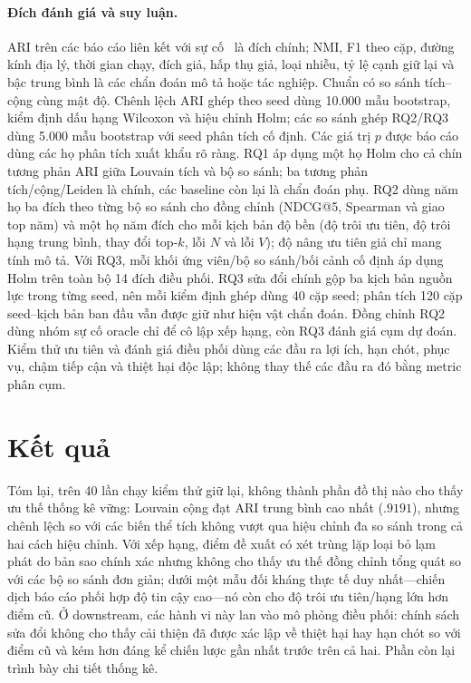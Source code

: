 \documentclass[runningheads]{llncs}
\begin{document}
\paragraph{Đích đánh giá và suy luận.}
ARI trên các báo cáo liên kết với sự cố~\cite{hubert1985comparing} là đích
chính; NMI, F1 theo cặp, đường kính địa lý, thời gian chạy, đích giả, hấp
thụ giả, loại nhiễu, tỷ lệ cạnh giữ lại và bậc trung bình là các chẩn đoán
mô tả hoặc tác nghiệp. Chuẩn có so sánh tích--cộng cùng mật độ. Chênh lệch
ARI ghép theo seed dùng 10.000 mẫu bootstrap, kiểm định dấu hạng Wilcoxon và
hiệu chỉnh Holm; các so sánh ghép RQ2/RQ3 dùng 5.000 mẫu bootstrap với seed
phân tích cố định. Các giá trị $p$ được báo cáo dùng các họ phân tích xuất
khẩu rõ ràng. RQ1 áp dụng một họ Holm cho cả chín tương phản ARI giữa
Louvain tích và bộ so sánh; ba tương phản tích/cộng/Leiden là chính, các
baseline còn lại là chẩn đoán phụ. RQ2 dùng năm họ ba đích theo từng bộ so
sánh cho đồng chỉnh (NDCG@5, Spearman và giao top năm) và một họ năm đích
cho mỗi kịch bản độ bền (độ trôi ưu tiên, độ trôi hạng trung bình, thay đổi
top-$k$, lỗi $N$ và lỗi $V$); độ nâng ưu tiên giả chỉ mang tính mô tả. Với
RQ3, mỗi khối ứng viên/bộ so sánh/bối cảnh cố định áp dụng Holm trên toàn bộ
14 đích điều phối. RQ3 sửa đổi chính gộp ba kịch bản nguồn lực trong từng
seed, nên mỗi kiểm định ghép dùng 40 cặp seed; phân tích 120 cặp seed--kịch
bản ban đầu vẫn được giữ như hiện vật chẩn đoán. Đồng chỉnh RQ2 dùng nhóm sự
cố oracle chỉ để cô lập xếp hạng, còn RQ3 đánh giá cụm dự đoán. Kiểm thử ưu
tiên và đánh giá điều phối dùng các đầu ra lợi ích, hạn chót, phục vụ, chậm
tiếp cận và thiệt hại độc lập; không thay thế các đầu ra đó bằng metric phân
cụm.

\section{Kết quả}
\label{sec:results}

Tóm lại, trên 40 lần chạy kiểm thử giữ lại, không thành phần đồ thị nào cho
thấy ưu thế thống kê vững: Louvain cộng đạt ARI trung bình cao nhất
($.9191$), nhưng chênh lệch so với các biến thể tích không vượt qua hiệu
chỉnh đa so sánh trong cả hai cách hiệu chỉnh. Với xếp hạng, điểm đề xuất có
xét trùng lặp loại bỏ lạm phát do bản sao chính xác nhưng không cho thấy ưu
thế đồng chỉnh tổng quát so với các bộ so sánh đơn giản; dưới một mẫu đối
kháng thực tế duy nhất---chiến dịch báo cáo phối hợp độ tin cậy cao---nó còn
cho độ trôi ưu tiên/hạng lớn hơn điểm cũ. Ở downstream, các hành vi này lan
vào mô phỏng điều phối: chính sách sửa đổi không cho thấy cải thiện đã được
xác lập về thiệt hại hay hạn chót so với điểm cũ và kém hơn đáng kể chiến
lược gần nhất trước trên cả hai. Phần còn lại trình bày chi tiết thống kê.
\end{document}

